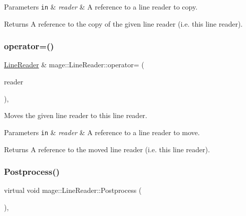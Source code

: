 \begin{DoxyParams}[1]{Parameters}
\mbox{\tt in}  & {\em reader} & A reference to a line reader to copy. \\
\hline
\end{DoxyParams}
\begin{DoxyReturn}{Returns}
A reference to the copy of the given line reader (i.\+e. this line reader). 
\end{DoxyReturn}
\hypertarget{classmage_1_1_line_reader_a3ba691cb32a1ab5dcbe75498068c1b86}{}\label{classmage_1_1_line_reader_a3ba691cb32a1ab5dcbe75498068c1b86} 
\subsubsection{\texorpdfstring{operator=()}{operator=()}\hspace{0.1cm}{\footnotesize\ttfamily [2/2]}}
{\footnotesize\ttfamily \hyperlink{classmage_1_1_line_reader}{Line\+Reader} \& mage\+::\+Line\+Reader\+::operator= (\begin{DoxyParamCaption}\item[{\hyperlink{classmage_1_1_line_reader}{Line\+Reader} \&\&}]{reader }\end{DoxyParamCaption})\hspace{0.3cm}{\ttfamily [default]}, {\ttfamily [noexcept]}}

Moves the given line reader to this line reader.


\begin{DoxyParams}[1]{Parameters}
\mbox{\tt in}  & {\em reader} & A reference to a line reader to move. \\
\hline
\end{DoxyParams}
\begin{DoxyReturn}{Returns}
A reference to the moved line reader (i.\+e. this line reader). 
\end{DoxyReturn}
\hypertarget{classmage_1_1_line_reader_adfde21013140a1058d3dd567204abfb5}{}\label{classmage_1_1_line_reader_adfde21013140a1058d3dd567204abfb5} 
\subsubsection{\texorpdfstring{Postprocess()}{Postprocess()}}
{\footnotesize\ttfamily virtual void mage\+::\+Line\+Reader\+::\+Postprocess (\begin{DoxyParamCaption}{ }\end{DoxyParamCaption})\hspace{0.3cm}{\ttfamily [private]}, {\ttfamily [virtual]}}

